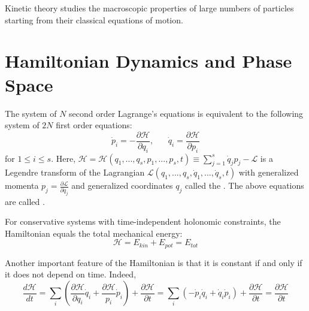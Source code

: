 \documentclass[12pt, a4paper, oneside, openright, titlepage]{book}
\begin{document}
Kinetic theory studies the macroscopic properties of large numbers of particles starting from their classical equations of motion.

\section{Hamiltonian Dynamics and Phase Space}

\begin{thm}
    The system of $N$ second order Lagrange's equations is equivalent to the following system of $2N$ first order equations: \begin{equation*}
        \dot{p}_i = -\frac{\partial \mathcal{H}}{\partial q_i},\;\;\;\;\;\;\dot{q}_i = \frac{\partial \mathcal{H}}{\partial p_i}
    \end{equation*}
    for $1 \leq i \leq s$. Here, $\mathcal{H} = \mathcal{H}(q_1,...,q_s,p_1,...,p_s,t) \equiv \sum_{j=1}^s\dot{q}_jp_j - \mathcal{L}$ is a Legendre transform of the Lagrangian $\mathcal{L}(q_1,...,q_s,\dot{q}_1,...,\dot{q}_s,t)$ with generalized momenta $p_j = \frac{\partial \mathcal{L}}{\partial \dot{q}_j}$ and generalized coordinates $q_j$ called the . The above equations are called .
\end{thm}

For conservative systems with time-independent holonomic constraints, the Hamiltonian equals the total mechanical energy: \begin{equation*}
    \mathcal{H} = E_{kin} + E_{pot} = E_{tot}
\end{equation*}

Another important feature of the Hamiltonian is that it is constant if and only if it does not depend on time. Indeed, \begin{equation*}
    \frac{d\mathcal{H}}{dt} = \sum_i\left(\frac{\partial \mathcal{H}}{\partial q_i}\dot{q}_i + \frac{\partial \mathcal{H}}{p_i}\dot{p}_i\right) + \frac{\partial \mathcal{H}}{\partial t} = \sum_i(-\dot{p}_i\dot{q}_i + \dot{q}_i\dot{p}_i)+\frac{\partial \mathcal{H}}{\partial t} = \frac{\partial \mathcal{H}}{\partial t}
\end{equation*}
\end{document}
